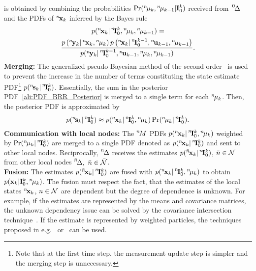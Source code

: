 \documentclass[conference,letterpaper]{IEEEtran}
\def\zeroth{\prescript{0\!}{}}
\def\nth{\prescript{n\!}{}}
\def\bnth{\prescript{\bar{n}\!}{}}
\begin{document}
is obtained by combining the probabilities $\Pr(\nth{\mu}_k,\nth{\mu}_{k-1} \vert \bfI^{k}_{0})$ received from~$\zeroth{\Delta}$ and the PDFs of $\nth{\bfx}_k$ inferred by the Bayes rule
\begin{multline*}
  p(\nth{\bfx}_{k}\vert\nth{\bfI}^{k}_{0},\nth{\mu}_k,\nth{\mu}_{k-1})
  =\\ \frac{p\left(\nth{\bfy}_{k} \vert\nth{\bfx}_{k},\nth{\mu}_k\right) 
  p\left(\nth{\bfx}_{k}\vert \nth{\bfI}^{k-1}_{0},\nth{\bfu}_{k-1},\nth{\mu}_{k-1}\right)}
  {p(\nth{\bfy}_k\vert\nth{\bfI}_0^{k-1},\nth{\bfu}_{k-1},\nth{\mu}_k,\nth{\mu}_{k-1})}.
\end{multline*}  
\textbf{Merging:} The generalized pseudo-Bayesian method of the second order~\cite{Watanabe1993:ja} is used to prevent the increase in the number of terms constituting the state estimate PDF\footnote{Note that at the first time step, the measurement update step is simpler and the merging step is unnecessary.} $p(\nth{\bfs}_{k} \vert\nth{\bfI}^{k}_{0})$. 
Essentially, the sum in the posterior PDF~\eqref{ali:PDF_BRR_Posterior} is merged to a single term for each $\nth{\mu}_k$.
Then, the posterior PDF is approximated by 
\begin{align}\label{ali:posterior}
  p(\nth{\bfs}_{k} \vert\nth{\bfI}^{k}_{0})\approx p(\nth{\bfx}_{k}\vert\nth{\bfI}^{k}_{0},\nth{\mu}_k) \Pr(\nth{\mu}_k\vert \nth{\bfI}^{k}_{0} ).
\end{align}
\textbf{Communication with local nodes:} The $\nth{M}$ PDFs $p(\nth{\bfx}_{k}\vert\nth{\bfI}^{k}_{0},\nth{\mu}_k)$ weighted by $\Pr(\nth{\mu}_k\vert \nth{\bfI}^{k}_{0} )$ are merged to a single PDF denoted as $p(\nth{\bfx}_k\vert\nth{\bfI}^k_0)$ and sent to other local nodes. 
Reciprocally, $\nth{\Delta}$ receives the estimates  $p(\bnth{\bfx}_k\vert\bnth{\bfI}^k_0)$, $\bar{n}\in\bar{\mathcal{N}}$ from other local nodes $\bnth{\Delta},\ \bar{n}\in\bar{\mcN}$.\\
\textbf{Fusion:}
The estimates $p(\bnth{\bfx}_k\vert\bnth{\bfI}^k_0)$ are fused with $p(\nth{\bfx}_{k}\vert\nth{\bfI}^{k}_{0},\nth{\mu}_k)$ to obtain $p(\bfx_{k}|\bfI_0^{k},\nth{\mu}_k)$.
The fusion must respect the fact, that the estimates of the local states $\nth{\bfx}_k$, $n\in\mathcal{N}$ are dependent but the degree of dependence is unknown. 
For example, if the estimates are represented by the means and covariance matrices, the unknown dependency issue can be solved by the covariance intersection technique~\cite{JuUhl:97}. 
If the estimate is represented by weighted particles, the techniques proposed in e.g.~\cite{Tslil2018:cp:IF} or~\cite{Ajgl2011:cp:IF} can be used.\\
\end{document}
